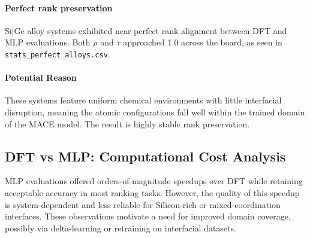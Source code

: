 \paragraph{Perfect rank preservation}

Si|Ge alloy systems exhibited near-perfect rank alignment between DFT and MLP evaluations. Both $\rho$ and $\tau$ approached 1.0 across the board, as seen in \texttt{stats\_perfect\_alloys.csv}.

\paragraph{Potential Reason}

These systems feature uniform chemical environments with little interfacial disruption, meaning the atomic configurations fall well within the trained domain of the MACE model. The result is highly stable rank preservation.

\subsection{DFT vs MLP: Computational Cost Analysis}

MLP evaluations offered orders-of-magnitude speedups over DFT while retaining acceptable accuracy in most ranking tasks. However, the quality of this speedup is system-dependent and less reliable for Silicon-rich or mixed-coordination interfaces. These observations motivate a need for improved domain coverage, possibly via delta-learning or retraining on interfacial datasets.